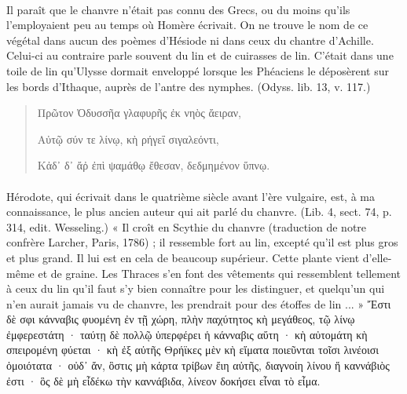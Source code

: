 \documentclass[a4paper, 11pt, oneside, polutonikogreek, french]{article}
\begin{document}
\paragraph{}
Il paraît que le chanvre n'était pas connu des Grecs, ou du moins qu'ils l'employaient peu au temps où Homère écrivait. On ne trouve le nom de ce végétal dans aucun des poèmes d'Hésiode ni dans ceux du chantre d'Achille. Celui-ci au contraire parle souvent du lin et de cuirasses de lin. C'était dans une toile de lin qu'Ulysse dormait enveloppé lorsque les Phéaciens le déposèrent sur les bords d'Ithaque, auprès de l'antre des nymphes. (Odyss. lib. 13, v. 117.)
\begin{quotation}
Πρῶτον Ὀδυσσῆα γλαφυρῆς ἐκ νηὸς ἄειραν,

Αὐτῷ σύν τε λίνῳ, κὴ ρήγεΐ σιγαλεόντι,

Κἀδ᾽ δ᾽ ἄῤ ἐπὶ ψαμάθῳ ἔθεσαν, δεδμημένον ὕπνῳ.
\end{quotation}
\paragraph{}
Hérodote, qui écrivait dans le quatrième siècle avant l'ère vulgaire, est, à ma connaissance, le plus ancien auteur qui ait parlé du chanvre. (Lib. 4, sect. 74, p. 314, edit. Wesseling.) « Il croît en Scythie du chanvre (traduction de notre confrère Larcher, Paris, 1786) ; il ressemble fort au lin, excepté qu'il est plus gros et plus grand. Il lui est en cela de beaucoup supérieur. Cette plante vient d'elle-même et de graine. Les Thraces s'en font des vêtements qui ressemblent tellement à ceux du lin qu'il faut s'y bien connaître pour les distinguer, et quelqu'un qui n'en aurait jamais vu de chanvre, les prendrait pour des étoffes de lin ... » Ἔστι δὲ σφι κάνναβις φυομένη ἐν τῇ χώρη, πλὴν παχύτητος κὴ μεγάθεος, τῷ λίνῳ ἐμφερεστάτη · ταύτῃ δὲ πολλῷ ὑπερφέρει ἡ κάνναβις αὕτη · κὴ αὐτομάτη κὴ σπειρομένη φύεται · κὴ ἐξ αὐτῆς Θρήϊκες μὲν κὴ εἵματα ποιεῦνται τοῖσι λινέοισι ὁμοιότατα · οὐδ᾽ ἄν, ὃστις μὴ κάρτα τρίβων ἔιη αὐτῆς, διαγνοίη λίνου ἥ καννάβιὸς ἐστι · ὃς δὲ μὴ εἶδέκω τὴν καννάβιδα, λίνεον δοκήσει εἶναι τὸ εἶμα.
\end{document}
